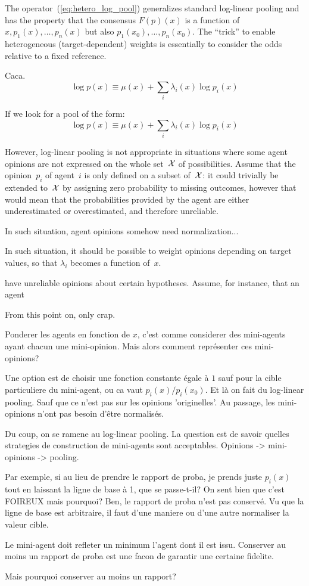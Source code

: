 \documentclass[english]{scrartcl}
\begin{document}
The operator~(\ref{eq:hetero_log_pool}) generalizes standard log-linear pooling and has the property that the consensus $F(p)(x)$ is a function of $x,p_1(x),\ldots,p_n(x)$ but also $p_1(x_0),\ldots,p_n(x_0)$. The ``trick'' to enable heterogeneous (target-dependent) weights is essentially to consider the odds relative to a fixed reference.

Caca.
$$
\log p(x) \equiv \mu(x) + \sum_i \lambda_i(x) \log p_i(x)
$$

If we look for a pool of the form:
$$
\log p(x) \equiv \mu(x) + \sum_i \lambda_i(x) \log p_i(x)
$$

However, log-linear pooling is not appropriate in situations where some agent opinions are not expressed on the whole set~${\cal X}$ of possibilities. Assume that the opinion~$p_i$ of agent~$i$ is only defined on a subset of~${\cal X}$: it could trivially be extended to~${\cal X}$ by assigning zero probability to missing outcomes, however that would mean that the probabilities provided by the agent are either underestimated or overestimated, and therefore unreliable.

In such situation, agent opinions somehow need normalization...

In such situation, it should be possible to weight opinions depending on target values, so that $\lambda_i$ becomes a function of~$x$.

have unreliable opinions about certain hypotheses. Assume, for instance, that an agent 

From this point on, only crap.

Ponderer les agents en fonction de $x$, c'est comme considerer des mini-agents ayant chacun une mini-opinion. Mais alors comment représenter ces mini-opinions? 

Une option est de choisir une fonction constante \'egale \`a $1$ sauf pour la cible particuliere du mini-agent, ou ca vaut $p_i(x)/p_i(x_0)$. Et là on fait du log-linear pooling. Sauf que ce n'est pas sur les opinions 'originelles'. Au passage, les mini-opinions n'ont pas besoin d'être normalisés. 

Du coup, on se ramene au log-linear pooling. La question est de savoir quelles strategies de construction de mini-agents sont acceptables. Opinions -> mini-opinions -> pooling.

Par exemple, si au lieu de prendre le rapport de proba, je prends juste $p_i(x)$ tout en laissant la ligne de base à 1, que se passe-t-il? On sent bien que c'est FOIREUX mais pourquoi? Ben, le rapport de proba n'est pas conserv\'e. Vu que la ligne de base est arbitraire, il faut d'une maniere ou d'une autre normaliser la valeur cible. 

Le mini-agent doit refleter un minimum l'agent dont il est issu. Conserver au moins un rapport de proba est une facon de garantir une certaine fidelite. 

Mais pourquoi conserver au moins un rapport? 



%



\end{document}
